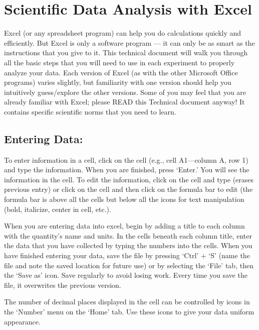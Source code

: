 \chapter{Scientific Data Analysis with Excel}
\thispagestyle{fancy}
\label{chap:excel-analysis}
%
Excel (or any spreadsheet program) can help you do calculations quickly and efficiently. 
But Excel is only a software program — it can only be as smart as the instructions that you give to it.
This technical document will walk you through all the basic steps that you will need to use in each experiment to properly analyze your data.
Each version of Excel (as with the other Microsoft Office programs) varies slightly, but familiarity with one version should help you intuitively guess/explore the other versions. 
Some of you may feel that you are already familiar with Excel; please READ this Technical document anyway! 
It contains specific scientific norms that you need to learn.

\section*{Entering Data:}
To enter information in a cell, click on the cell (e.g., cell A1—column A, row 1) and type the information. 
When you are finished, press `Enter.' 
You will see the information in the cell. 
To edit the information, click on the cell and type (erases previous entry) or click on the cell and then click on the formula bar to edit (the formula bar is above all the cells but below all the icons for text manipulation (bold, italicize, center in cell, etc.).
\par 
When you are entering data into excel, begin by adding a title to each column with the quantity's name and units.
In the cells beneath each column title, enter the data that you have collected by typing the numbers into the cells.
When you have finished entering your data, save the file by pressing `Ctrl' + `S' (name the file and note the saved location for future use) or by selecting the `File' tab, then the `Save as' icon. 
Save regularly to avoid losing work.
Every time you save the file, it overwrites the previous version.
\par 
The number of decimal places displayed in the cell can be controlled by icons in the `Number' menu on the `Home' tab.
Use these icons to give your data uniform appearance.

